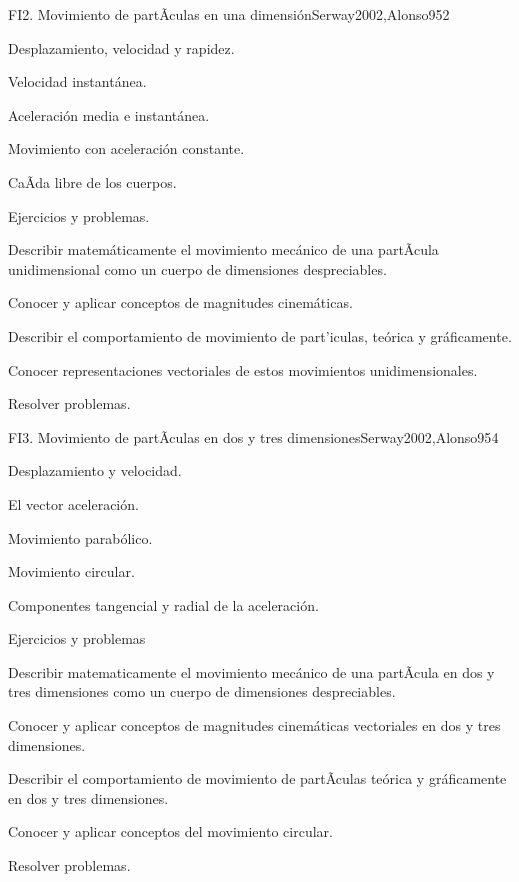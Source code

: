 \begin{syllabus}
\begin{unit}{FI2. Movimiento de partÃ­culas en una dimensión}{Serway2002,Alonso95}{2}
\begin{topics}
      \item Desplazamiento, velocidad y rapidez.
      \item Velocidad instantánea.
      \item Aceleración media e instantánea.
      \item Movimiento con aceleración constante.
      \item CaÃ­da libre de los cuerpos.
      \item Ejercicios y problemas.
    \end{topics}
   \begin{unitgoals}
      \item Describir matemáticamente el movimiento mecánico de una partÃ­cula unidimensional como un cuerpo de dimensiones despreciables.
      \item Conocer y aplicar conceptos de magnitudes cinemáticas.
      \item Describir el comportamiento de movimiento de part'iculas, teórica y gráficamente.
      \item Conocer representaciones vectoriales de estos movimientos unidimensionales.
      \item Resolver problemas.
   \end{unitgoals}
\end{unit}

\begin{unit}{FI3. Movimiento de partÃ­culas en dos y tres dimensiones}{Serway2002,Alonso95}{4}
\begin{topics}
      \item Desplazamiento y velocidad.
      \item El vector aceleración.
      \item Movimiento parabólico.
      \item Movimiento circular.
      \item Componentes tangencial y radial de la aceleración.
      \item Ejercicios y problemas
\end{topics}

   \begin{unitgoals}
      \item Describir matematicamente el movimiento mecánico de una partÃ­cula en dos y tres dimensiones como un cuerpo de dimensiones despreciables.
      \item Conocer y aplicar conceptos de magnitudes cinemáticas vectoriales en dos y tres dimensiones.
      \item Describir el comportamiento de movimiento de partÃ­culas teórica y gráficamente en dos y tres dimensiones.
      \item Conocer y aplicar conceptos del movimiento circular.
      \item Resolver problemas.
   \end{unitgoals}
\end{unit}


\end{syllabus}
